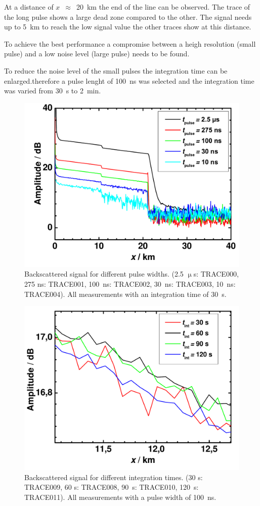 At a distance of $x$~$\approx$~20~km the end of the line can be observed.
The trace of the long pulse shows a large dead zone compared to the other. The signal needs up to 5~km to reach the low signal value the other traces show at this distance. 

To achieve the best performance a compromise between a heigh resolution (small pulse) and a low noise level (large pulse) needs to be found.

To reduce the noise level of the small pulses the integration time can be enlarged.therefore a pulse lenght of 100~ns was selected and the integration time was varied from 30~s to 2~min. 

\begin{figure}%
\centering
\includegraphics[width=.6\columnwidth]{grafiken/1_time.pdf}%
\caption{Backscattered signal for different pulse widths. (2.5 $\upmu$s: TRACE000, 275 ns: TRACE001, 100~ns: TRACE002, 30~ns: TRACE003, 10~ns: TRACE004). All measurements with an integration time of 30~s.}%
\label{fig:1_time}%
\end{figure}

\begin{figure}%
\centering
\includegraphics[width=.6\columnwidth]{grafiken/1_integration.pdf}%
\caption{Backscattered signal for different integration times. (30 s: TRACE009, 60 s: TRACE008, 90~s: TRACE010, 120~s: TRACE011). All measurements with a pulse width of 100~ns.}%
\label{fig:integration}%
\end{figure}

